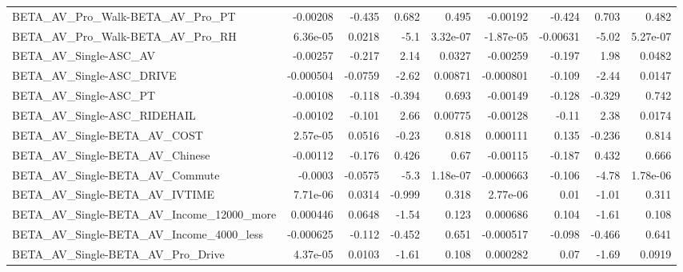 \begin{tabular}{lrrrrrrrr}
BETA\_AV\_Pro\_Walk-BETA\_AV\_Pro\_PT                    &    -0.00208 &       -0.435 &     0.682 &    0.495 &   -0.00192 &      -0.424 &        0.703 &         0.482 \\
BETA\_AV\_Pro\_Walk-BETA\_AV\_Pro\_RH                    &    6.36e-05 &       0.0218 &      -5.1 & 3.32e-07 &  -1.87e-05 &    -0.00631 &        -5.02 &      5.27e-07 \\
BETA\_AV\_Single-ASC\_AV                              &    -0.00257 &       -0.217 &      2.14 &   0.0327 &   -0.00259 &      -0.197 &         1.98 &        0.0482 \\
BETA\_AV\_Single-ASC\_DRIVE                           &   -0.000504 &      -0.0759 &     -2.62 &  0.00871 &  -0.000801 &      -0.109 &        -2.44 &        0.0147 \\
BETA\_AV\_Single-ASC\_PT                              &    -0.00108 &       -0.118 &    -0.394 &    0.693 &   -0.00149 &      -0.128 &       -0.329 &         0.742 \\
BETA\_AV\_Single-ASC\_RIDEHAIL                        &    -0.00102 &       -0.101 &      2.66 &  0.00775 &   -0.00128 &       -0.11 &         2.38 &        0.0174 \\
BETA\_AV\_Single-BETA\_AV\_COST                        &    2.57e-05 &       0.0516 &     -0.23 &    0.818 &   0.000111 &       0.135 &       -0.236 &         0.814 \\
BETA\_AV\_Single-BETA\_AV\_Chinese                     &    -0.00112 &       -0.176 &     0.426 &     0.67 &   -0.00115 &      -0.187 &        0.432 &         0.666 \\
BETA\_AV\_Single-BETA\_AV\_Commute                     &     -0.0003 &      -0.0575 &      -5.3 & 1.18e-07 &  -0.000663 &      -0.106 &        -4.78 &      1.78e-06 \\
BETA\_AV\_Single-BETA\_AV\_IVTIME                      &    7.71e-06 &       0.0314 &    -0.999 &    0.318 &   2.77e-06 &        0.01 &        -1.01 &         0.311 \\
BETA\_AV\_Single-BETA\_AV\_Income\_12000\_more           &    0.000446 &       0.0648 &     -1.54 &    0.123 &   0.000686 &       0.104 &        -1.61 &         0.108 \\
BETA\_AV\_Single-BETA\_AV\_Income\_4000\_less            &   -0.000625 &       -0.112 &    -0.452 &    0.651 &  -0.000517 &      -0.098 &       -0.466 &         0.641 \\
BETA\_AV\_Single-BETA\_AV\_Pro\_Drive                   &    4.37e-05 &       0.0103 &     -1.61 &    0.108 &   0.000282 &        0.07 &        -1.69 &        0.0919 \\

\end{tabular}
